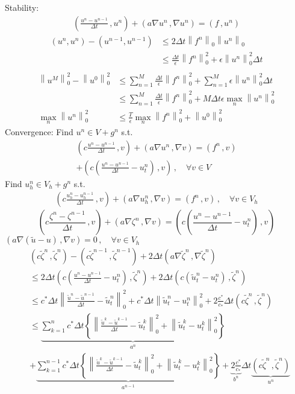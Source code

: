 \documentclass[letterpaper]{article}
\providecommand{\norm}[1]{\left\lVert#1\right\rVert}
\providecommand{\inner}[1]{\left(#1\right)}
\begin{document}
\begin{multicols}{2}
Stability:
\begin{align*}
\inner{\frac{u^n-u^{n-1}}{\Delta t}\,,u^n}+\inner{a\nabla u^n\,,\nabla u^n}
=\inner{f\,,u^n}
\end{align*}
\begin{align*}
\inner{u^n,u^n}-\inner{u^{n-1},u^{n-1}}&\le2\Delta t\norm{f^n}_0\norm{u^n}_0\\
&\le\frac{\Delta t}{\epsilon}\norm{f^n}_0^2+\epsilon\norm{u^n}_0^2\Delta t\\
\end{align*}
\begin{align*}
\norm{u^M}_0^2-\norm{u^0}_0^2
&\le\sum_{n=1}^M\frac{\Delta t}{\epsilon}\norm{f^n}_0^2
+\sum_{n=1}^M\epsilon\norm{u^n}_0^2\Delta t\\
&\le\sum_{n=1}^M\frac{\Delta t}{\epsilon}\norm{f^n}_0^2
+M\Delta t\epsilon\max_n\norm{u^n}_0^2\\
\max_n\norm{u^n}_0^2&\le \frac{T}{\epsilon}\max_n\norm{f^n}_0^2+\norm{u^0}_0^2
\end{align*}
Convergence: 
Find $u^n\in V+g^n$ s.t.
\begin{align*}
\inner{c\frac{u^n-u^{n-1}}{\Delta t}\,,v}+\inner{a\nabla u^n\,,\nabla v}
=\inner{f^n\,,v}\\
+\inner{c\inner{\frac{u^n-u^{n-1}}{\Delta t}-u_t^n}\,, v}\,, \quad\forall v\in V
\end{align*}
Find $u_h^n\in V_h+g^n$ s.t.
\begin{align*}
\inner{c\frac{u_h^n-u_h^{n-1}}{\Delta t}\,,v}+\inner{a\nabla u_h^n\,,\nabla v}
=\inner{f^n\,,v} \,, \quad\forall v\in V_h
\end{align*}
\[
\inner{c\frac{\zeta^n-\zeta^{n-1}}{\Delta t}\,,v}
+\inner{a\nabla\zeta^n\,,\nabla v}
=\inner{c\inner{\frac{u^n-u^{n-1}}{\Delta t}-u_t^n}\,,v}
\]
$\inner{a\nabla(\tilde u-u)\,,\nabla v}=0\,,\quad\forall v\in V_h$
\begin{align*}
&\inner{c\tilde\zeta^n\,,\tilde\zeta^n}-\inner{c\tilde\zeta^{n-1}\,,\tilde\zeta^{n-1}}
+2\Delta t\inner{a\nabla\tilde\zeta^n\,,\nabla\tilde\zeta^n}\\
&\le 2\Delta t\inner{c\inner{\frac{u^n-u^{n-1}}{\Delta t}-u_t^n}\,,\tilde\zeta^n}
+2\Delta t\inner{c\inner{\tilde u_t^n-u_t^n}\,,\tilde\zeta^n}\\
&\le c^*\Delta t
\norm{\frac{\tilde u^n-\tilde u^{n-1}}{\Delta t}-\tilde u_t^n}_0^2
+c^*\Delta t\norm{\tilde u_t^n-u_t^n}_0^2
+2\frac{c^*}{c_*}\Delta t\inner{c\tilde\zeta^n\,,\tilde\zeta^n}\\
&\le\underbrace{\sum_{k=1}^nc^*\Delta t\left\{
\norm{\frac{\tilde u^k-\tilde u^{k-1}}{\Delta t}-\tilde u_t^k}_0^2
+\norm{\tilde u_t^k-u_t^k}_0^2\right\}}_{a^n}\\
&+\underbrace{\sum_{k=1}^{n-1}c^*\Delta t\left\{
\norm{\frac{\tilde u^k-\tilde u^{k-1}}{\Delta t}-\tilde u_t^k}_0^2
+\norm{\tilde u_t^k-u_t^k}_0^2\right\}}_{a^{n-1}}
+\underbrace{2\frac{c^*}{c_*}}_{b^n}
\Delta t\underbrace{\inner{c\tilde\zeta^n\,,\tilde\zeta^n}}_{u^n}
\end{align*}


\end{multicols}
\end{document}
